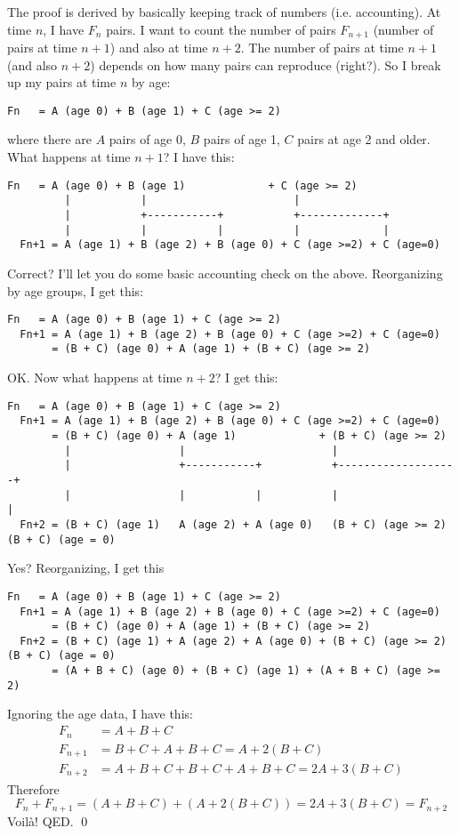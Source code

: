 The proof is derived by basically keeping track of numbers (i.e. accounting).
At time $n$, I have $F_n$ pairs.
I want to count the number of pairs
$F_{n+1}$ (number of pairs at time $n + 1$) and also at time $n + 2$.
The number of pairs at time $n + 1$ (and also $n + 2$) depends on
how many pairs can reproduce (right?). So I break up my pairs at time $n$
by age:
\begin{Verbatim}[fontsize=\footnotesize]
  Fn   = A (age 0) + B (age 1) + C (age >= 2) 
\end{Verbatim}
where there are $A$ pairs of age 0, $B$ pairs of age 1, $C$ pairs at age 2 and
older.
What happens at time $n + 1$? I have this:
\begin{Verbatim}[fontsize=\footnotesize]
  Fn   = A (age 0) + B (age 1)             + C (age >= 2)
         |           |                       |
         |           +-----------+           +-------------+
         |           |           |           |             |
  Fn+1 = A (age 1) + B (age 2) + B (age 0) + C (age >=2) + C (age=0)
  \end{Verbatim}
Correct? I'll let you do some basic accounting check on the above.
Reorganizing by age groups, I get this:
\begin{Verbatim}[fontsize=\footnotesize]
  Fn   = A (age 0) + B (age 1) + C (age >= 2)
  Fn+1 = A (age 1) + B (age 2) + B (age 0) + C (age >=2) + C (age=0)
       = (B + C) (age 0) + A (age 1) + (B + C) (age >= 2)
  \end{Verbatim}
OK. Now what happens at time $n + 2$? I get this:
\begin{Verbatim}[fontsize=\footnotesize]
  Fn   = A (age 0) + B (age 1) + C (age >= 2)
  Fn+1 = A (age 1) + B (age 2) + B (age 0) + C (age >=2) + C (age=0)
       = (B + C) (age 0) + A (age 1)             + (B + C) (age >= 2)
         |                 |                       |
         |                 +-----------+           +-------------------+
         |                 |           |           |                   |
  Fn+2 = (B + C) (age 1)   A (age 2) + A (age 0)   (B + C) (age >= 2)  (B + C) (age = 0)
\end{Verbatim}
Yes? Reorganizing, I get this
\begin{Verbatim}[fontsize=\footnotesize]
  Fn   = A (age 0) + B (age 1) + C (age >= 2)
  Fn+1 = A (age 1) + B (age 2) + B (age 0) + C (age >=2) + C (age=0)
       = (B + C) (age 0) + A (age 1) + (B + C) (age >= 2)
  Fn+2 = (B + C) (age 1) + A (age 2) + A (age 0) + (B + C) (age >= 2)  (B + C) (age = 0)
       = (A + B + C) (age 0) + (B + C) (age 1) + (A + B + C) (age >= 2)
  \end{Verbatim}
Ignoring the age data, I have this:
\begin{align*}
  F_n &= A + B + C \\
  F_{n+1} &= B + C + A + B + C = A + 2(B + C)\\
  F_{n+2} &= A + B + C + B + C + A + B + C = 2A + 3(B + C)
\end{align*}
Therefore
\[
F_n + F_{n + 1} = \left(A + B + C\right) + \left(A + 2(B + C)\right) = 2A + 3(B + C) = F_{n + 2}
\]
Voil\`a! QED.
\qed

